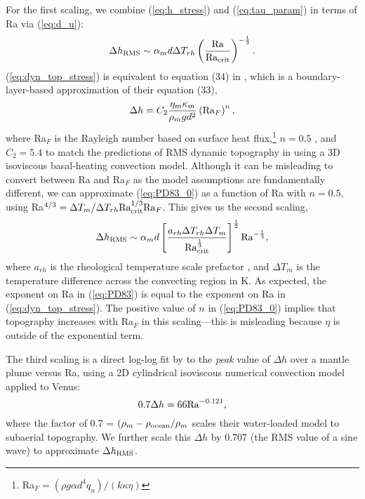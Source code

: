 For the first scaling, we combine (\ref{eq:h_stress}) and (\ref{eq:tau_param}) in terms of Ra via (\ref{eq:d_u}):
\begin{equation}\label{eq:dyn_top_stress}
\Delta h_{\rm RMS} \sim \alpha_m d \Delta T_{rh} \left(\frac{\rm Ra}{\rm Ra_{\rm crit}}\right)^{-\frac{1}{3}}.
\end{equation}
(\ref{eq:dyn_top_stress}) is equivalent to equation (34) in \citet{Parsons1983}, which is a boundary-layer-based approximation of their equation (33),
\begin{equation}\label{eq:PD83_0}
\Delta h = C_2 \frac{\eta_m \kappa_m}{\rho_m g d^2} \left({\rm Ra}_F\right)^n,
\end{equation}
where Ra$_F$ is the Rayleigh number based on surface heat flux,\footnote{Ra$_F = (\rho g \alpha d^4 q_u)/(k \kappa \eta)$} $n = 0.5$ \citep{McKenzie1977}, and $C_2 = 5.4$ to match the predictions of RMS dynamic topography in \citet{Lees2019} using a 3D isoviscous basal-heating convection model. Although it can be misleading to convert between Ra and Ra$_F$ as the model assumptions are fundamentally different, we can approximate (\ref{eq:PD83_0}) as a function of Ra with $n = 0.5$, using Ra$^{4/3} = \Delta T_m / \Delta T_{rh} {\rm Ra}_{\rm crit}^{1/3} {\rm Ra}_F$. This gives us the second scaling,
\begin{equation}\label{eq:PD83}
\Delta h_{\rm RMS} \sim \alpha_m d \left[\frac{a_{rh} \Delta T_{rh} \Delta T_m}{{\rm Ra}_{\rm crit}^{\frac{1}{3}}}\right]^{\frac{1}{2}} {\rm Ra}^{-\frac{1}{3}},
\end{equation}
where $a_{rh}$ is the rheological temperature scale prefactor \citep[equal to 2.44;][]{Thiriet2019}, and $\Delta T_m$ is the temperature difference across the convecting region in K. As expected, the exponent on Ra in (\ref{eq:PD83}) is equal to the exponent on Ra in (\ref{eq:dyn_top_stress}). The positive value of $n$ in (\ref{eq:PD83_0}) implies that topography increases with Ra$_F$ in this scaling---this is misleading because $\eta$ is outside of the exponential term.

The third scaling is a direct log-log fit by \citep{Kiefer1992} to the \emph{peak} value of $\Delta h$ over a mantle plume versus Ra, using a 2D cylindrical isoviscous numerical convection model applied to Venus:
\begin{equation}\label{eq:KH92}
0.7 \Delta h = 66 {\rm Ra}^{-0.121},
\end{equation}
where the factor of 0.7 = $(\rho_m - \rho_{\rm ocean} / \rho_m$ scales their water-loaded model to subaerial topography. We further scale this $\Delta h$ by 0.707 (the RMS value of a sine wave) to approximate $\Delta h_{\rm RMS}$.

